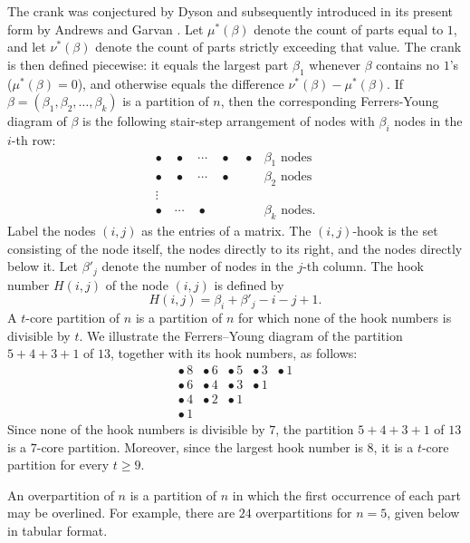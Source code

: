\documentclass[12pt,oneside,reqno]{amsart}
\numberwithin{equation}{section}
\begin{document}
The crank was conjectured by Dyson and subsequently introduced in its 
present form by Andrews and Garvan \cite{AndrewsGarvan1988}. Let $\mu^*(\beta)$ denote the count of parts equal to $1$, and let $\nu^*(\beta)$ denote the count of parts strictly exceeding
that value. The crank is then defined piecewise: it equals the largest part
$\beta_1$ whenever $\beta$ contains no $1$'s ($\mu^*(\beta) = 0$), and
otherwise equals the difference $\nu^*(\beta) - \mu^*(\beta)$.
If $\beta=(\beta_1,\beta_2,\ldots,\beta_k)$ is a partition of 
$n$, then the corresponding Ferrers-Young diagram of $\beta$ is the 
following stair-step arrangement of nodes with $\beta_i$ nodes in the 
$i$-th row: 
\[ 
\begin{array}{ll} 
	\bullet\quad\bullet\quad\cdots\quad\bullet\quad\bullet 
	& \beta_1\text{ nodes}\\[5pt] 
	\bullet\quad\bullet\quad\cdots\quad\bullet 
	& \beta_2\text{ nodes}\\[5pt] 
	\vdots & \\[3pt] 
	\bullet\quad\cdots\quad\bullet 
	& \beta_k\text{ nodes}. 
\end{array} 
\] 
Label the nodes $(i,j)$ as the entries of a matrix. The $(i,j)$-hook is 
the set consisting of the node itself, the nodes directly to its right, 
and the nodes directly below it. Let $\beta'_j$ denote the number of 
nodes in the $j$-th column. The hook number $H(i,j)$ of the node $(i,j)$ 
is defined by 
\[ 
H(i,j)=\beta_i+\beta'_j-i-j+1. 
\] 
A $t$-core partition of $n$ is a partition of $n$ for which none of the 
hook numbers is divisible by $t$. We illustrate the Ferrers--Young diagram of the partition 
$5+4+3+1$ of $13$, together with its hook numbers, as follows: 
\[ 
\begin{array}{ccccc} 
	\bullet\,8 & \bullet\,6 & \bullet\,5 & \bullet\,3 & \bullet\,1\\[4pt] 
	\bullet\,6 & \bullet\,4 & \bullet\,3 & \bullet\,1 & \\[4pt] 
	\bullet\,4 & \bullet\,2 & \bullet\,1 & & \\[4pt] 
	\bullet\,1 & & & & 
\end{array} 
\] 
Since none of the hook numbers is divisible by $7$, the partition 
$5+4+3+1$ of $13$ is a $7$-core partition. Moreover, since the 
largest hook number is $8$, it is a $t$-core partition for every 
$t\geq 9$.

An overpartition of $n$ is a partition of $n$ in which the first
occurrence of each part may be overlined. For example, there are $24$
overpartitions for $n=5$, given below in tabular format.
\end{document}
